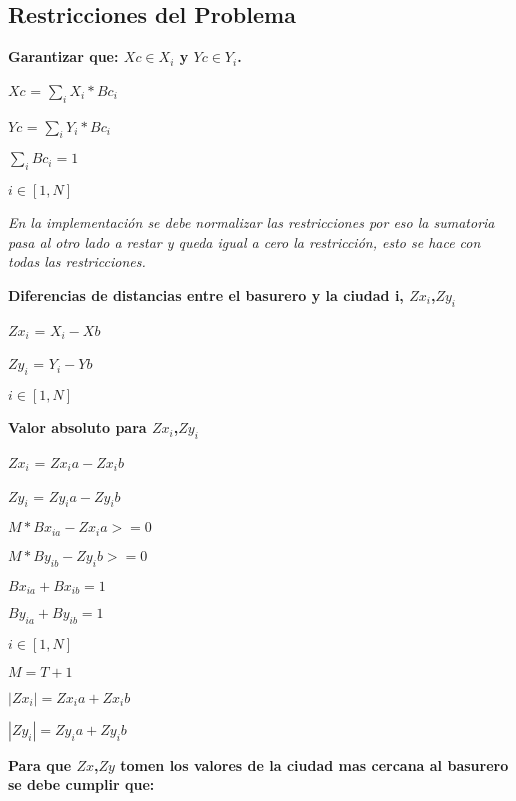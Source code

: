 \documentclass[10pt]{article}
\begin{document}
\subsection{Restricciones del Problema}
\textbf{Garantizar que:  $Xc \in X_i$ y $Yc \in Y_i$. }\\

\begin{center}
$Xc$ = $\sum_i X_i * Bc_i$

$Yc$ = $\sum_i Y_i * Bc_i$

$\sum_i Bc_i = 1$

$i \in [1,N]$

 \emph{En la implementación se debe normalizar las restricciones por eso la sumatoria pasa al otro lado a restar y queda igual a cero la restricci\'on, esto se hace con todas las restricciones.}

\end{center}

\newpage

\textbf{Diferencias de distancias entre el basurero y la ciudad i, $Zx_i$,$Zy_i$ }\\

\begin{center}

 $Zx_i$ = $X_i- Xb $ 
 
  $Zy_i$ = $Y_i-Yb$ 
  
  $i \in [1,N]$
\end{center}

\textbf{Valor absoluto para  $Zx_i$,$Zy_i$ }\\

\begin{center}

 $Zx_i$ = $Zx_ia  - Zx_ib$ 
 
  $Zy_i$ = $Zy_ia  - Zy_ib$ \medskip 
  
  $M*Bx_{ia} - Zx_ia >= 0$
  
  $M*By_{ib} - Zy_ib >= 0$\medskip 
  
  $ Bx_{ia} + Bx_{ib} = 1 $
  
  $ By_{ia} + By_{ib} = 1 $\medskip 
  
   $i \in [1,N]$
   
   $M=T+1$\bigskip
  
   $ |Zx_i|=Zx_ia  + Zx_ib $ 
   
   $ |Zy_i|=Zy_ia  +  Zy_ib $ 
\end{center}


\textbf{Para que  $Zx$,$Zy$  tomen los valores de la ciudad mas cercana al basurero se debe cumplir que: }\\
\end{document}
